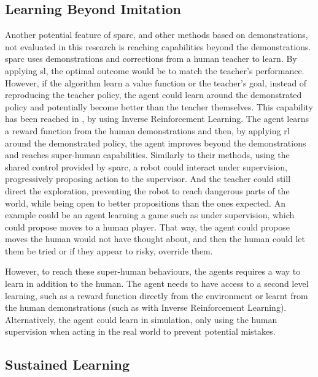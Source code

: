 
\subsection{Learning Beyond Imitation}
Another potential feature of \gls{sparc}, and other methods based on demonstrations, not evaluated in this research is reaching capabilities beyond the demonstrations. \gls{sparc} uses demonstrations and corrections from a human teacher to learn. By applying \gls{sl}, the optimal outcome would be to match the teacher's performance. However, if the algorithm learn a value function or the teacher's goal, instead of reproducing the teacher policy, the agent could learn around the demonstrated policy and potentially become better than the teacher themselves. This capability has been reached in \cite{abbeel2004apprenticeship}, by using Inverse Reinforcement Learning. The agent learns a reward function from the human demonstrations and then, by applying \gls{rl} around the demonstrated policy, the agent improves beyond the demonstrations and reaches super-human capabilities. Similarly to their methods, using the shared control provided by \gls{sparc}, a robot could interact under supervision, progressively proposing action to the supervisor. And the teacher could still direct the exploration, preventing the robot to reach dangerous parts of the world, while being open to better propositions than the ones expected. An example could be an agent learning a game such as under supervision, which could propose moves to a human player. That way, the agent could propose moves the human would not have thought about, and then the human could let them be tried or if they appear to risky, override them. 

However, to reach these super-human behaviours, the agents requires a way to learn in addition to the human. The agent needs to have access to a second level learning, such as a reward function directly from the environment or learnt from the human demonstrations (such as with Inverse Reinforcement Learning). Alternatively, the agent could learn in simulation, only using the human supervision when acting in the real world to prevent potential mistakes.

\subsection{Sustained Learning}

